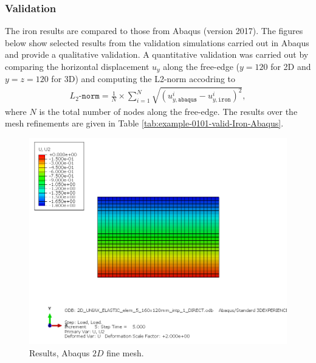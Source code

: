 \subsubsection{Validation}
%


%
The iron results are compared to those from Abaqus (version 2017). The figures below show selected results from the validation simulations carried out in Abaqus and provide a qualitative validation. A quantitative validation was carried out by comparing the horizontal displacement $u_y$ along the free-edge ($y=120$ for 2D and $y=z=120$ for 3D) and computing the L2-norm accodring to
\begin{align}
    L_2\texttt{-norm} = \frac{1}{N} \times  \sum_{i=1}^{N} \sqrt{\left(u_{y,\texttt{abaqus}}^i-u_{y,\texttt{iron}}^i  \right)^2},
\end{align}
where $N$ is the total number of nodes along the free-edge. The results over the mesh refinements are given in Table \ref{tab:example-0101-valid-Iron-Abaqus}.
%
\begin{figure}[h!]
    \centering 
    \includegraphics[width=\columnwidth]{examples/example-0101/doc/figures/2D_UNIAX_ELASTIC_elem_5_160x120mm_intp_1_DIRECTU2.png} 
    \caption{Results, Abaqus $2D$ fine mesh.}
    \label{example-0101-abaqus-2D-fig}
\end{figure}
%
